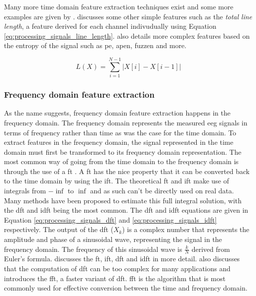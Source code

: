 Many more time domain feature extraction techniques exist and some more examples are given by \citet{eeg_features}.
\citet{eeg_features} discusses some other simple features such as the \textit{total line length}, a feature derived for each channel indivudually using Equation \ref{eq:processing_signals_line_length}.
 also details more complex features based on the entropy of the signal such as \gls{pe}, \gls{apen}, \gls{fuzzen} and more.

\begin{equation}
    \label{eq:processing_signals_line_length}
    L(X) = \sum_{i=1}^{N-1} |X[i] - X[i - 1]|
\end{equation}



\subsubsection{Frequency domain feature extraction}
\label{subsubsec:processing_signals_general_pipeline_features_freqdomain}

As the name suggests, frequency domain feature extraction happens in the frequency domain.
The frequency domain represents the measured \gls{eeg} signals in terms of frequency rather than time as was the case for the time domain.
To extract features in the frequency domain, the signal represented in the time domain must first be transformed to its frequency domain representation.
The most common way of going from the time domain to the frequency domain is through the use of a \gls{ft} \citep{fourier_transform}.
A  \gls{ft} has the nice property that it can be converted back to the time domain by using the \gls{ift}.
The theoretical \gls{ft} and \gls{ift} make use of integrals from $-\inf$ to $\inf$ and as such can't be directly used on real data.
Many methods have been proposed to estimate this full integral solution, with the \gls{dft} and \gls{idft} being the most common.
The \gls{dft} and \gls{idft} equations are given in Equation \ref{eq:processing_signals_dft} and \ref{eq:processing_signals_idft} respectively.
The output of the \gls{dft} ($X_k$) is a complex number that represents the amplitude and phase of a sinusoidal wave, representing the signal in the frequency domain.
The frequency of this sinusoidal wave is $\frac{k}{N}$ derived from Euler's formula.
 discusses the \gls{ft}, \gls{ift}, \gls{dft} and \gls{idft} in more detail.
 also discusses that the computation of \gls{dft} can be too complex for many applications and introduces the \gls{fft}, a faster variant of \gls{dft}.
\Gls{fft} is the algorithm that is most commonly used for effective conversion between the time and frequency domain.


